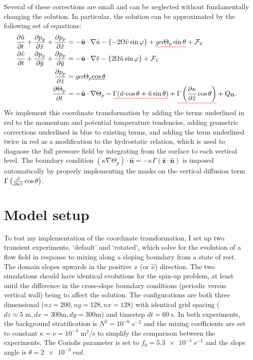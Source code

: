 \documentclass{article}
\def\mathunderline#1#2{\color{#1}\underline{{\color{black}#2}}\color{black}}
\begin{document}
Several of these corrections are small and can be neglected without fundamentally changing the solution. In particular, the solution can be approximated by the following set of equations:
\begin{align}
    \pdv{\hat{u}}{t} + \pdv{p_{g}}{\hat{x}} + \pdv{p_{p}}{\hat{x}} &= - \hat{\bm{u}} \cdot \nabla \hat{u} - \left\{-2\Omega \hat{v} \sin{\varphi} \right\} + \mathunderline{red}{g\alpha \Theta_{p} \sin{\theta}} + \mathcal{F}_{\hat{u}}
    \label{mitgcmrotated1}
    \\
    \pdv{\hat{v}}{t} + \pdv{p_{g}}{\hat{y}} + \pdv{p_{p}}{\hat{y}} &= - \hat{\bm{u}} \cdot \nabla \hat{v} -\left\{2\Omega \hat{u} \sin{\varphi} \right\} + \mathcal{F}_{\hat{v}}
    \\
    \pdv{p_{p}}{\hat{z}} &= g\alpha \Theta_{p}\mathunderline{blue}{\cos{\theta}}
    \\
    \pdv{\Theta_{p}}{t} &= - \hat{\bm{u}} \cdot \nabla \Theta_{p} - 
    \mathunderline{red}{\Gamma (\hat{w}\cos{\theta} + \hat{u}\sin{\theta})} + 
    \mathunderline{red}{\Gamma \left(\pdv{\kappa}{\hat{z}}\cos{\theta} \right)} + Q_{\Theta}.\label{mitgcmrotated2}
\end{align}
We implement this coordinate transformation by adding the terms underlined in red to the momentum and potential temperature tendencies, adding geometric corrections underlined in blue to existing terms, and adding the term underlined twice in red as a modification to the hydrostatic relation, which is used to diagnose the full pressure field by integrating from the surface to each vertical level. The boundary condition $\left(\kappa \nabla \Theta_{p} \right) \cdot \hat{\bm{n}} = - \kappa \Gamma (\hat{\bm{z}} \cdot \hat{\bm{n}})$ is imposed automatically by properly implementing the masks on the vertical diffusion term $\Gamma \left(\pdv{\kappa{\hat{z}}} \cos{\theta} \right)$.

\section{Model setup}

To test my implementation of the coordinate transformation, I set up two transient experiments, `default' and `rotated', which solve for the evolution of a flow field in response to mixing along a sloping boundary from a state of rest. The domain slopes upwards in the positive $x$ (or $\hat{x}$) direction. The two simulations should have identical evolutions for the spin-up problem, at least until the difference in the cross-slope boundary conditions (periodic versus vertical wall) being to affect the solution. The configurations are both three dimensional ($nz = 200, ny = 128, nx = 128$) with identical grid spacing ($dz \approx 5 \text{ m}, dx = 300 \text{m}, dy = 300 \text{m}$) and timestep $dt=\SI{60}{s}$. In both experiments, the background stratification is $N^{2} = 10^{-6}$ s$^{-2}$ and the mixing coefficients are set to constant $\kappa = \nu = 10^{-3}$ m$^{2}$/s to simplify the comparison between the experiments. The Coriolis parameter is set to $f_{0} = \SI{5.3e-5}{s^{-1}}$ and the slope angle is $\theta = \SI{2e-3}{rad}$.
\end{document}
